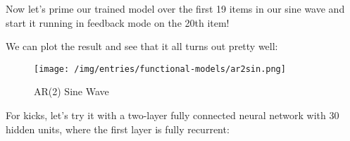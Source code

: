 \documentclass[]{article}
\newenvironment{Shaded}{}{}
\newcommand{\CommentTok}[1]{\textcolor[rgb]{0.38,0.63,0.69}{\textit{#1}}}
\newcommand{\DecValTok}[1]{\textcolor[rgb]{0.25,0.63,0.44}{#1}}
\newcommand{\FloatTok}[1]{\textcolor[rgb]{0.25,0.63,0.44}{#1}}
\newcommand{\FunctionTok}[1]{\textcolor[rgb]{0.02,0.16,0.49}{#1}}
\newcommand{\KeywordTok}[1]{\textcolor[rgb]{0.00,0.44,0.13}{\textbf{#1}}}
\newcommand{\NormalTok}[1]{#1}
\begin{document}
Now let's prime our trained model over the first 19 items in our sine wave and
start it running in feedback mode on the 20th item!

\begin{Shaded}
\end{Shaded}

We can plot the result and see that it all turns out pretty well:

\begin{figure}
\centering
\texttt{[image: /img/entries/functional-models/ar2sin.png]}
\caption{AR(2) Sine Wave}
\end{figure}

For kicks, let's try it with a two-layer fully connected neural network with 30
hidden units, where the first layer is fully recurrent:
\end{document}

